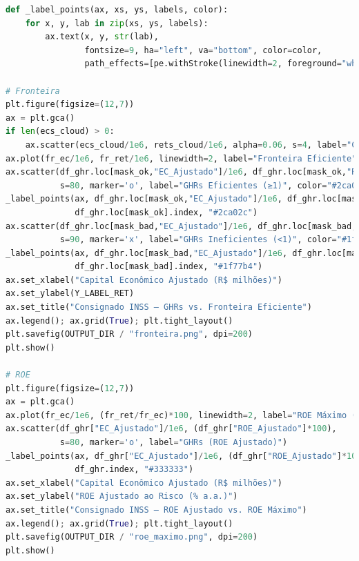 \documentclass[11pt,a4paper]{article}
\newcommand{\1}{\mathbf{1}}
\begin{document}
\begin{lstlisting}[language=Python, caption={risk_frontier.py (versão completa com normalização por prazo e visões)}]
def _label_points(ax, xs, ys, labels, color):
    for x, y, lab in zip(xs, ys, labels):
        ax.text(x, y, str(lab),
                fontsize=9, ha="left", va="bottom", color=color,
                path_effects=[pe.withStroke(linewidth=2, foreground="white")])

# Fronteira
plt.figure(figsize=(12,7))
ax = plt.gca()
if len(ecs_cloud) > 0:
    ax.scatter(ecs_cloud/1e6, rets_cloud/1e6, alpha=0.06, s=4, label="Carteiras Simuladas")
ax.plot(fr_ec/1e6, fr_ret/1e6, linewidth=2, label="Fronteira Eficiente")
ax.scatter(df_ghr.loc[mask_ok,"EC_Ajustado"]/1e6, df_ghr.loc[mask_ok,"Ret_Metrica"]/1e6,
           s=80, marker='o', label="GHRs Eficientes (≥1)", color="#2ca02c")
_label_points(ax, df_ghr.loc[mask_ok,"EC_Ajustado"]/1e6, df_ghr.loc[mask_ok,"Ret_Metrica"]/1e6,
              df_ghr.loc[mask_ok].index, "#2ca02c")
ax.scatter(df_ghr.loc[mask_bad,"EC_Ajustado"]/1e6, df_ghr.loc[mask_bad,"Ret_Metrica"]/1e6,
           s=90, marker='x', label="GHRs Ineficientes (<1)", color="#1f77b4")
_label_points(ax, df_ghr.loc[mask_bad,"EC_Ajustado"]/1e6, df_ghr.loc[mask_bad,"Ret_Metrica"]/1e6,
              df_ghr.loc[mask_bad].index, "#1f77b4")
ax.set_xlabel("Capital Econômico Ajustado (R$ milhões)")
ax.set_ylabel(Y_LABEL_RET)
ax.set_title("Consignado INSS – GHRs vs. Fronteira Eficiente")
ax.legend(); ax.grid(True); plt.tight_layout()
plt.savefig(OUTPUT_DIR / "fronteira.png", dpi=200)
plt.show()

# ROE
plt.figure(figsize=(12,7))
ax = plt.gca()
ax.plot(fr_ec/1e6, (fr_ret/fr_ec)*100, linewidth=2, label="ROE Máximo (Fronteira)")
ax.scatter(df_ghr["EC_Ajustado"]/1e6, (df_ghr["ROE_Ajustado"]*100),
           s=80, marker='o', label="GHRs (ROE Ajustado)")
_label_points(ax, df_ghr["EC_Ajustado"]/1e6, (df_ghr["ROE_Ajustado"]*100),
              df_ghr.index, "#333333")
ax.set_xlabel("Capital Econômico Ajustado (R$ milhões)")
ax.set_ylabel("ROE Ajustado ao Risco (% a.a.)")
ax.set_title("Consignado INSS – ROE Ajustado vs. ROE Máximo")
ax.legend(); ax.grid(True); plt.tight_layout()
plt.savefig(OUTPUT_DIR / "roe_maximo.png", dpi=200)
plt.show()


\end{lstlisting}
\end{document}
